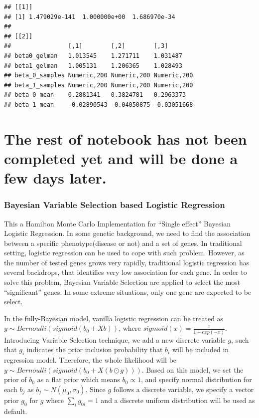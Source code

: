\documentclass[
]{article}
\begin{document}
\begin{verbatim}
## [[1]]
## [1] 1.479029e-141  1.000000e+00  1.686970e-34
## 
## [[2]]
##                [,1]        [,2]        [,3]       
## beta0_gelman   1.013545    1.271711    1.031487   
## beta1_gelman   1.005131    1.206365    1.028493   
## beta_0_samples Numeric,200 Numeric,200 Numeric,200
## beta_1_samples Numeric,200 Numeric,200 Numeric,200
## beta_0_mean    0.2881341   0.3824781   0.2963373  
## beta_1_mean    -0.02890543 -0.04050875 -0.03051668
\end{verbatim}

\hypertarget{the-rest-of-notebook-has-not-been-completed-yet-and-will-be-done-a-few-days-later.}{%
\section{The rest of notebook has not been completed yet and will be
done a few days
later.}\label{the-rest-of-notebook-has-not-been-completed-yet-and-will-be-done-a-few-days-later.}}

\hypertarget{bayesian-variable-selection-based-logistic-regression}{%
\subsubsection{Bayesian Variable Selection based Logistic
Regression}\label{bayesian-variable-selection-based-logistic-regression}}

This a Hamilton Monte Carlo Implementation for ``Single effect''
Bayesian Logistic Regression. In some genetic background, we need to
find the association between a specific phenotype(disease or not) and a
set of genes. In traditional setting, logistic regression can be used to
cope with such problem. However, as the number of tested genes grows
very rapidly, traditional logistic regression has several backdrops,
that identifies very low association for each gene. In order to solve
this problem, Bayesian Variable Selection are applied to select the most
``significant'' genes. In some extreme situations, only one gene are
expected to be select.

In the fully-Bayesian model, vanilla logistic regression can be treated
as \(y \sim Bernoulli(sigmoid(b_0 + Xb))\), where
\(sigmoid(x) = \frac{1}{1 + exp(-x)}\). Introducing Variable Selection
technique, we add a new discrete variable \(g\), such that \(g_i\)
indicates the prior inclusion probability that \(b_i\) will be included
in regression model. Therefore, the whole likelihood will be
\(y \sim Bernoulli(sigmoid(b_0 + X(b \odot g)))\). Based on this model,
we set the prior of \(b_0\) as a flat prior which means
\(b_0 \varpropto 1\), and specify normal distribution for each \(b_j\)
as \(b_j \sim N(\mu_0, \sigma_0)\). Since \(g\) follows a discrete
variable, we specify a vector prior \(g_0\) for \(g\) where
\(\sum_ig_{0i} = 1\) and a discrete uniform distribution will be used as
default.
\end{document}
